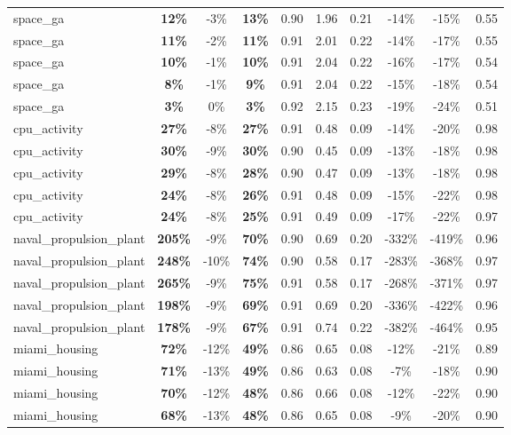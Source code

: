 \begin{table}[!htbp]
\begin{small}
\begin{sc}
{\begin{tabular}{lccccccccc}
space\_ga & \textbf{12\%} & -3\% & \textbf{13\%} & 0.90 & 1.96 & 0.21 & -14\% & -15\% & 0.55 \\
space\_ga & \textbf{11\%} & -2\% & \textbf{11\%} & 0.91 & 2.01 & 0.22 & -14\% & -17\% & 0.55 \\
space\_ga & \textbf{10\%} & -1\% & \textbf{10\%} & 0.91 & 2.04 & 0.22 & -16\% & -17\% & 0.54 \\
space\_ga & \textbf{8\%} & -1\% & \textbf{9\%} & 0.91 & 2.04 & 0.22 & -15\% & -18\% & 0.54 \\
space\_ga & \textbf{3\%} & 0\% & \textbf{3\%} & 0.92 & 2.15 & 0.23 & -19\% & -24\% & 0.51 \\
cpu\_activity & \textbf{27\%} & -8\% & \textbf{27\%} & 0.91 & 0.48 & 0.09 & -14\% & -20\% & 0.98 \\
cpu\_activity & \textbf{30\%} & -9\% & \textbf{30\%} & 0.90 & 0.45 & 0.09 & -13\% & -18\% & 0.98 \\
cpu\_activity & \textbf{29\%} & -8\% & \textbf{28\%} & 0.90 & 0.47 & 0.09 & -13\% & -18\% & 0.98 \\
cpu\_activity & \textbf{24\%} & -8\% & \textbf{26\%} & 0.91 & 0.48 & 0.09 & -15\% & -22\% & 0.98 \\
cpu\_activity & \textbf{24\%} & -8\% & \textbf{25\%} & 0.91 & 0.49 & 0.09 & -17\% & -22\% & 0.97 \\
naval\_propulsion\_plant & \textbf{205\%} & -9\% & \textbf{70\%} & 0.90 & 0.69 & 0.20 & -332\% & -419\% & 0.96 \\
naval\_propulsion\_plant & \textbf{248\%} & -10\% & \textbf{74\%} & 0.90 & 0.58 & 0.17 & -283\% & -368\% & 0.97 \\
naval\_propulsion\_plant & \textbf{265\%} & -9\% & \textbf{75\%} & 0.91 & 0.58 & 0.17 & -268\% & -371\% & 0.97 \\
naval\_propulsion\_plant & \textbf{198\%} & -9\% & \textbf{69\%} & 0.91 & 0.69 & 0.20 & -336\% & -422\% & 0.96 \\
naval\_propulsion\_plant & \textbf{178\%} & -9\% & \textbf{67\%} & 0.91 & 0.74 & 0.22 & -382\% & -464\% & 0.95 \\
miami\_housing & \textbf{72\%} & -12\% & \textbf{49\%} & 0.86 & 0.65 & 0.08 & -12\% & -21\% & 0.89 \\
miami\_housing & \textbf{71\%} & -13\% & \textbf{49\%} & 0.86 & 0.63 & 0.08 & -7\% & -18\% & 0.90 \\
miami\_housing & \textbf{70\%} & -12\% & \textbf{48\%} & 0.86 & 0.66 & 0.08 & -12\% & -22\% & 0.90 \\
miami\_housing & \textbf{68\%} & -13\% & \textbf{48\%} & 0.86 & 0.65 & 0.08 & -9\% & -20\% & 0.90 \\

\end{tabular}}
\end{sc}
\end{small}
\end{table}
